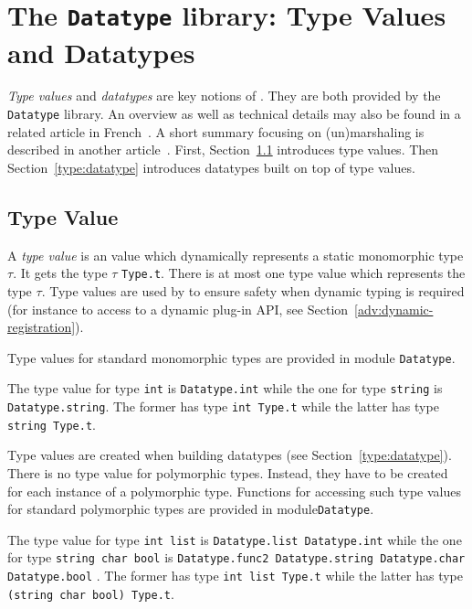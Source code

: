 
\section{The \texttt{Datatype} library: Type Values and
  Datatypes}\label{adv:datatype}

\emph{Type values} and \emph{datatypes} are key notions of \framac. They are
both provided by the \texttt{Datatype} library. An overview as well as technical
details may also be found in a related article in
French~\cite{signoles:jfla11}. A short summary focusing on (un)marshaling is
described in another article~\cite{cuoq:ml11}. First,
Section~\ref{type:type-value} introduces type values. Then
Section~\ref{type:datatype} introduces datatypes built on top of type values.

\subsection{Type Value}\label{type:type-value}

A \emph{type value} is an \caml value which dynamically represents a static
monomorphic \caml type $\tau$. It gets the type $\tau$
\texttt{Type.t}. There is at most one type value which
represents the type $\tau$. Type values are used by \framac to ensure safety
when dynamic typing is required (for instance to access to a dynamic plug-in
API, see Section~\ref{adv:dynamic-registration}).

Type values for standard \caml monomorphic types are provided in module
\texttt{Datatype}.
\begin{example}
The type value for type \texttt{int} is
\texttt{Datatype.int} while the one for type
\texttt{string} is \texttt{Datatype.string}. The
former has type \texttt{int Type.t} while the latter has type \texttt{string
  Type.t}.
\end{example}

Type values are created when building datatypes (see
Section~\ref{type:datatype}). There is no type value for polymorphic
types. Instead, they have to be created for each instance of a polymorphic
type. Functions for accessing such type values for standard \caml polymorphic
types are provided in module\texttt{Datatype}.
\begin{example}
The type value for type \texttt{int list} is \texttt{Datatype.list
  Datatype.int} while the one
for type \texttt{string \fl char \fl bool} is \texttt{Datatype.func2
  Datatype.string Datatype.char
  Datatype.bool}%
. The former has type
\texttt{int list Type.t} while the latter has type \texttt{(string \fl char \fl
  bool) Type.t}.
\end{example}

